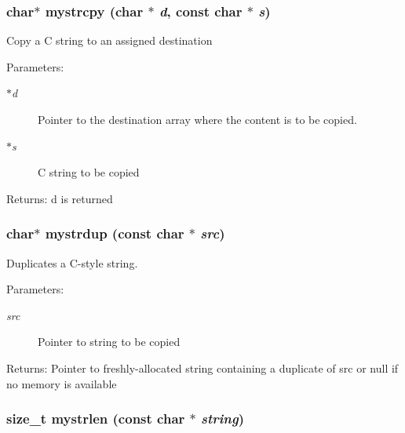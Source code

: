 \subsubsection{\setlength{\rightskip}{0pt plus 5cm}char$\ast$ mystrcpy (char $\ast$ {\em d}, const char $\ast$ {\em s})}\label{mystring_8h_73d1b6d63115637abb80ccb5d32bec31}


Copy a C string to an assigned destination \begin{Desc}
\item[Parameters:]
\begin{description}
\item[{\em $\ast$d}]Pointer to the destination array where the content is to be copied. \item[{\em $\ast$s}]C string to be copied \end{description}
\end{Desc}
\begin{Desc}
\item[Returns:]d is returned \end{Desc}
\subsubsection{\setlength{\rightskip}{0pt plus 5cm}char$\ast$ mystrdup (const char $\ast$ {\em src})}\label{mystring_8h_148a52c665d88f52fb4995338a319d3c}


Duplicates a C-style string. \begin{Desc}
\item[Parameters:]
\begin{description}
\item[{\em src}]Pointer to string to be copied \end{description}
\end{Desc}
\begin{Desc}
\item[Returns:]Pointer to freshly-allocated string containing a duplicate of src or null if no memory is available \end{Desc}
\subsubsection{\setlength{\rightskip}{0pt plus 5cm}size\_\-t mystrlen (const char $\ast$ {\em string})}\label{mystring_8h_024ec4fe2e0814f14c6e17b2c79f91e3}


